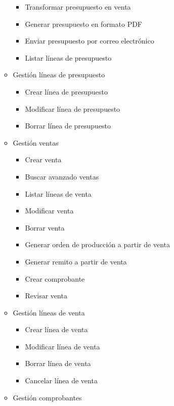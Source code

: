 \begin{itemize}
\begin{itemize}
\begin{itemize}
                \item Transformar presupuesto en venta
                \item Generar presupuesto en formato PDF
                \item Enviar presupuesto por correo electrónico
                \item Listar líneas de presupuesto
            \end{itemize}
            \item Gestión líneas de presupuesto
            \begin{itemize}
                \item Crear línea de presupuesto
                \item Modificar línea de presupuesto
                \item Borrar línea de presupuesto
            \end{itemize}
            \item Gestión ventas
            \begin{itemize}
                \item Crear venta
                \item Buscar avanzado ventas
                \item Listar líneas de venta
                \item Modificar venta
                \item Borrar venta
                \item Generar orden de producción a partir de venta
                \item Generar remito a partir de venta
                \item Crear comprobante 
                \item Revisar venta
            \end{itemize}
            \item Gestión líneas de venta
            \begin{itemize}
                \item Crear línea de venta
                \item Modificar línea de venta
                \item Borrar línea de venta
                \item Cancelar línea de venta
            \end{itemize}
            \item Gestión comprobantes
            \begin{itemize}

\end{itemize}
\end{itemize}
\end{itemize}
